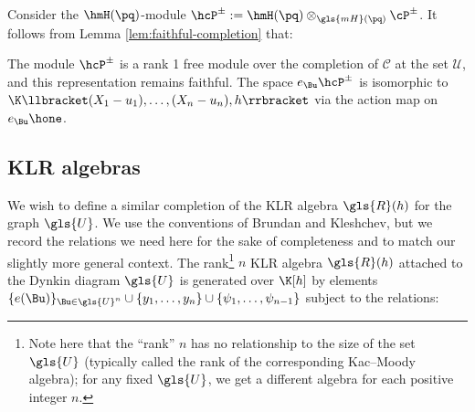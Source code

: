 Consider the $\hmH(\pq)$-module $\hcP^\pm :=\hmH(\pq)
\otimes_{\gls{mH}(\pq)}\cP^\pm$. It follows from Lemma
\ref{lem:faithful-completion} that:
\begin{lemma}\label{lem:Hecke-P}
 The module $\hcP^\pm$ is a rank 1 free module over the completion
 of $\mathcal{C} $ at the set $\mathcal{U}$, and this
 representation remains faithful. The space $e_{\Bu}\hcP^\pm $ is isomorphic to
$\K\llbracket (X_1-{u_1}),\dots, (X_n-{u_n}),h\rrbracket $ via the action map on
$e_{\Bu}\hone$.
 \end{lemma}

\subsection{KLR algebras}

We wish to define a similar completion of the KLR algebra $\gls{R}(h)$ for the
graph $\gls{U}$. We use the conventions of Brundan and Kleshchev, but we
record the relations we need here for the sake of completeness and to
match our slightly more general context. The rank\footnote{Note here
 that the ``rank'' $n$ has no relationship to the size of the set $\gls{U}$
(typically called the rank of the corresponding Kac--Moody algebra);
for any fixed $\gls{U}$, we get a different algebra for each positive
integer $n$.} $n$ KLR algebra $\gls{R}(h)$ attached to the Dynkin
diagram $\gls{U}$ is
generated over $\K[h]$ 
by elements $\{e(\Bu)\}_{\Bu\in \gls{U}^n}\cup \{y_1,\dots, y_n\}\cup \{\psi_1,\dots, \psi_{n-1}\}$
subject to the relations:
